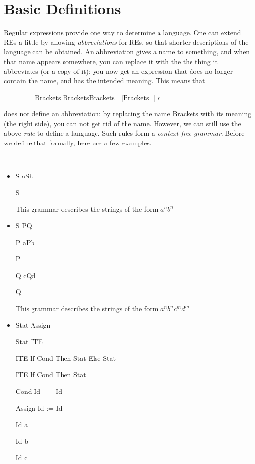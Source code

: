 \section{Basic Definitions}

Regular expressions provide one way to determine a language. One can
extend REs a little by allowing {\em abbreviations} for REs, so that
shorter descriptions of the language can be obtained. An abbreviation
gives a name to something, and when that name appears somewhere, you
can replace it with the the thing it abbreviates (or a copy of it):
you now get an expression that does no longer contain the name, and
has the intended meaning. This means that

~~~~~~~~~Brackets \rpijl BracketsBrackets $|$ [Brackets] $|$ $\epsilon$

does not define an abbreviation: by replacing the name Brackets with
its meaning (the right side), you can not get rid of the
name. However, we can still use the above {\em rule} to define a
language. Such rules form a {\em context free grammar}. Before we
define that formally, here are a few examples:

\begin{vb}
~~~
\begin{itemize}
\item
S \rpijl aSb

S \rpijl \eps

This grammar describes the strings of the form $a^nb^n$

\item

S \rpijl PQ

P \rpijl aPb

P \rpijl \eps

Q \rpijl cQd

Q \rpijl \eps

This grammar describes the strings of the form $a^nb^nc^md^m$


\item \label{statlabel}
Stat \rpijl Assign

Stat \rpijl ITE

ITE \rpijl If Cond Then Stat Else Stat

ITE \rpijl If Cond Then Stat

Cond \rpijl Id == Id

Assign \rpijl Id := Id

Id \rpijl a

Id \rpijl b

Id \rpijl c

\end{itemize}

\end{vb}

